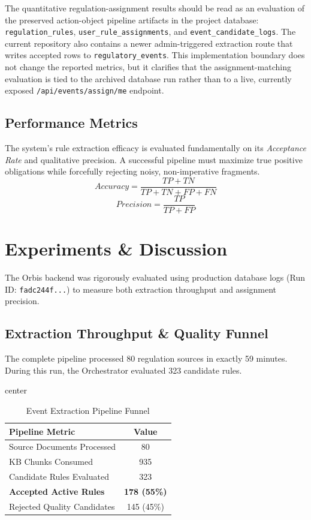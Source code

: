 \documentclass[a4paper,12pt]{article}
\begin{document}
The quantitative regulation-assignment results should be read as an evaluation of the preserved action-object pipeline artifacts in the project database: \texttt{regulation\_rules}, \texttt{user\_rule\_assignments}, and \texttt{event\_candidate\_logs}. The current repository also contains a newer admin-triggered extraction route that writes accepted rows to \texttt{regulatory\_events}. This implementation boundary does not change the reported metrics, but it clarifies that the assignment-matching evaluation is tied to the archived database run rather than to a live, currently exposed \texttt{/api/events/assign/me} endpoint.

\subsection{Performance Metrics}
The system's rule extraction efficacy is evaluated fundamentally on its \textit{Acceptance Rate} and qualitative precision. A successful pipeline must maximize true positive obligations while forcefully rejecting noisy, non-imperative fragments.
$$Accuracy = \frac{TP + TN}{TP + TN + FP + FN}$$
$$Precision = \frac{TP}{TP + FP}$$

\section{Experiments \& Discussion}
The Orbis backend was rigorously evaluated using production database logs (Run ID: \texttt{fadc244f...}) to measure both extraction throughput and assignment precision. 

\subsection{Extraction Throughput \& Quality Funnel}
The complete pipeline processed 80 regulation sources in exactly 59 minutes. During this run, the Orchestrator evaluated 323 candidate rules. 

\begin{table}[H]
    \centering
    \begin{adjustbox}{center}
        \begin{tabular}{l c}
            \toprule
            \textbf{Pipeline Metric} & \textbf{Value} \\ \midrule
            Source Documents Processed & 80 \\
            KB Chunks Consumed & 935 \\
            Candidate Rules Evaluated & 323 \\
            \textbf{Accepted Active Rules} & \textbf{178 (55\%)} \\
            Rejected Quality Candidates & 145 (45\%) \\
            \bottomrule
        \end{tabular}
    \end{adjustbox}
    \caption{Event Extraction Pipeline Funnel}
    \label{tab:extraction_funnel}
\end{table}
\end{document}
